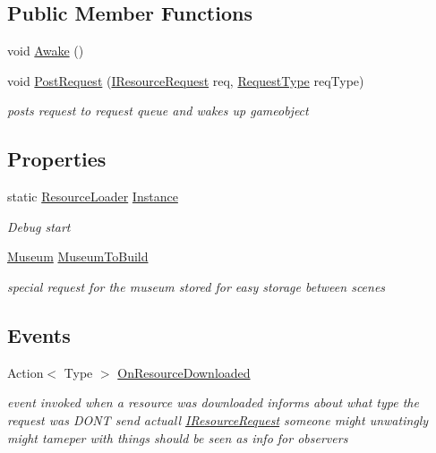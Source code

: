 \subsection*{Public Member Functions}
\begin{DoxyCompactItemize}
\item 
void \mbox{\hyperlink{class_resource_loader_ad258acc6c5c963d5ca93dbe36e243d20}{Awake}} ()
\item 
void \mbox{\hyperlink{class_resource_loader_abcaa27712f43f305baef3df7722c9e73}{Post\+Request}} (\mbox{\hyperlink{interface_i_resource_request}{I\+Resource\+Request}} req, \mbox{\hyperlink{class_resource_loader_a55469e5c9294ec83732bfa4e2c3135ab}{Request\+Type}} req\+Type)
\begin{DoxyCompactList}\small\item\em posts request to request queue and wakes up gameobject \end{DoxyCompactList}\end{DoxyCompactItemize}
\subsection*{Properties}
\begin{DoxyCompactItemize}
\item 
static \mbox{\hyperlink{class_resource_loader}{Resource\+Loader}} \mbox{\hyperlink{class_resource_loader_a66d4b7f32938dad50d13f48e362b7b76}{Instance}}
\begin{DoxyCompactList}\small\item\em Debug start \end{DoxyCompactList}\item 
\mbox{\hyperlink{class_museum}{Museum}} \mbox{\hyperlink{class_resource_loader_ade4e93d50757ee75b2356a663c7fd3cd}{Museum\+To\+Build}}
\begin{DoxyCompactList}\small\item\em special request for the museum stored for easy storage between scenes \end{DoxyCompactList}\end{DoxyCompactItemize}
\subsection*{Events}
\begin{DoxyCompactItemize}
\item 
Action$<$ Type $>$ \mbox{\hyperlink{class_resource_loader_a81acd4bfcfed997a7a339d90383a2a26}{On\+Resource\+Downloaded}}
\begin{DoxyCompactList}\small\item\em event invoked when a resource was downloaded informs about what type the request was D\+O\+NT send actuall \mbox{\hyperlink{interface_i_resource_request}{I\+Resource\+Request}} someone might unwatingly might tameper with things should be seen as info for observers \end{DoxyCompactList}\end{DoxyCompactItemize}
